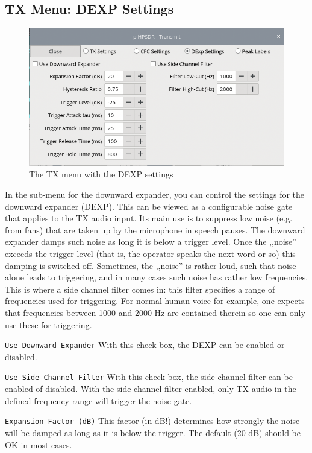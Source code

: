 \documentclass[12pt]{book}
\def\rett#1{\texttt{\color{red}#1}}
\begin{document}
\subsection{TX Menu: DEXP Settings}
\label{sec:dexp}

\begin{figure}[ht]
\center
\includegraphics[scale=0.45]{TX_DEXP.png}
\caption{The TX menu with the DEXP settings}
\label{fig:DEXPmenu}
\end{figure}

In the sub-menu for the downward expander, you can control the settings for the downward expander
(DEXP). This can be viewed
as a configurable noise gate that applies to the TX audio input. Its main use is to suppress low noise
(e.g. from fans) that are taken up  by the microphone in speech pauses. The downward expander damps
such noise as long it is below a trigger level. Once the ,,noise'' exceeds the trigger level (that is,
the  operator speaks the next word or so) this damping is switched off. Sometimes, the ,,noise'' is
rather loud, such that noise alone leads to triggering, and in many cases such noise has rather low
frequencies. This is where a side channel filter comes in: this filter specifies a range of frequencies
used for triggering. For normal human voice for example, one expects that frequencies between 1000 and
2000 Hz are contained therein so one can only use these for triggering.

\rett{Use Downward Expander} With this check box, the DEXP can be enabled or disabled.

\rett{Use Side Channel Filter} With this check box, the side channel filter can be enabled of disabled.
With the  side channel filter enabled, only TX audio in the defined frequency  range will trigger the
noise gate.

\rett{Expansion Factor (dB)} This factor (in dB!) determines how strongly the noise will be damped as long
as it is below the trigger. The default (20 dB) should be OK in most cases.
\end{document}
